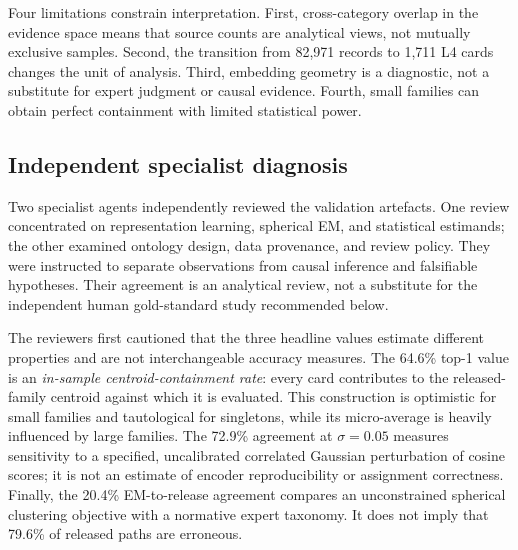 \documentclass[11pt,a4paper]{article}
\begin{document}
Four limitations constrain interpretation. First, cross-category overlap in
the evidence space means that source counts are analytical views, not mutually
exclusive samples. Second, the transition from 82,971 records to 1,711 L4
cards changes the unit of analysis. Third, embedding geometry is a diagnostic,
not a substitute for expert judgment or causal evidence. Fourth, small
families can obtain perfect containment with limited statistical power.

\subsection{Independent specialist diagnosis}

Two specialist agents independently reviewed the validation artefacts. One
review concentrated on representation learning, spherical EM, and statistical
estimands; the other examined ontology design, data provenance, and review
policy. They were instructed to separate observations from causal inference
and falsifiable hypotheses. Their agreement is an analytical review, not a
substitute for the independent human gold-standard study recommended below.

The reviewers first cautioned that the three headline values estimate
different properties and are not interchangeable accuracy measures. The
64.6\% top-1 value is an \emph{in-sample centroid-containment rate}: every card
contributes to the released-family centroid against which it is evaluated.
This construction is optimistic for small families and tautological for
singletons, while its micro-average is heavily influenced by large families.
The 72.9\% agreement at $\sigma=0.05$ measures sensitivity to a specified,
uncalibrated correlated Gaussian perturbation of cosine scores; it is not an
estimate of encoder reproducibility or assignment correctness. Finally, the
20.4\% EM-to-release agreement compares an unconstrained spherical clustering
objective with a normative expert taxonomy. It does not imply that 79.6\% of
released paths are erroneous.
\end{document}

